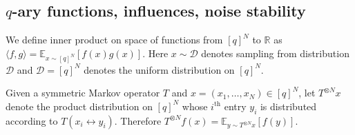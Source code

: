 \documentclass[10pt]{article}
\theoremstyle{definition}
\numberwithin{equation}{section}
\newcommand{\R}{{\mathbb R}}
\newcommand{\expct}[2]{\mathbb{E}_{#1}\left[#2\right]}
\newcommand{\xiffy}[2]{\ensuremath{{#1} \mathcal{\leftrightarrow} {#2}}}
\newcommand{\texsup}[2]{\ensuremath{\text{#1}^{\text{#2}}}}
\begin{document}
\subsection{\texorpdfstring{$q$-ary functions, influences, noise stability}{q-ary functions, influences, noise stability}}
%
We define inner product on space of functions from $[q]^N$ to
$\R$ as $\langle f,g \rangle = \expct{x\sim[q]^N}{f(x)
  g(x)}$. Here $x \sim \mathcal{D}$ denotes sampling from distribution
$\mathcal{D}$ and $\mathcal{D} = [q]^N$ denotes the uniform
distribution on $[q]^N$.

Given a symmetric Markov operator $T$ and
$x=(x_1,\ldots,x_N)\in[q]^N$, let $T^{\otimes N} x$ denote the product
distribution on $[q]^N$ whose \texsup{$i$}{th} entry $y_i$ is
distributed according to $T(\xiffy{x_i}{y_i})$. Therefore $T^{\otimes
  N} f (x) = \expct{y \sim T^{\otimes N} x} { f(y)}$.
\end{document}
